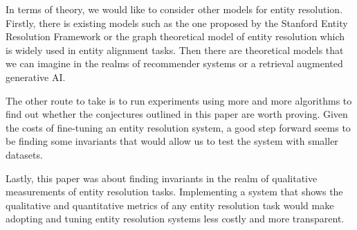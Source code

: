 \documentclass[journal]{IEEEtran}
\begin{document}
    In terms of theory, we would like to consider other models for entity
    resolution.
    Firstly, there is existing models such as the one proposed by the Stanford
    Entity Resolution Framework\cite{Ben2009Swoosh} or the graph theoretical
    model of entity resolution which is widely used in entity alignment tasks.
    Then there are theoretical models that we can imagine in the realms of
    recommender systems or a retrieval augmented generative AI.

    The other route to take is to run experiments using more and more algorithms
    to find out whether the conjectures outlined in this paper are worth proving.
    Given the costs of fine-tuning an entity resolution system, a good step
    forward seems to be finding some invariants that would allow us to test
    the system with smaller datasets.

    Lastly, this paper was about finding invariants in the realm of qualitative
    measurements of entity resolution tasks.
    Implementing a system that shows the qualitative and quantitative metrics
    of any entity resolution task would make adopting and tuning entity
    resolution systems less costly and more transparent.
\end{document}
